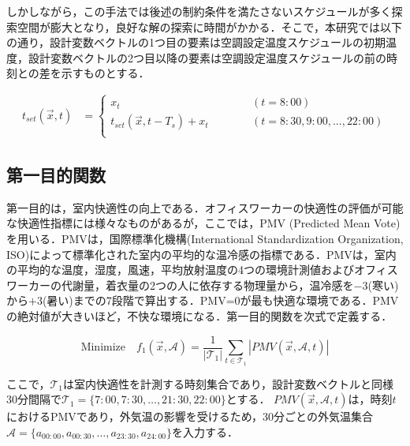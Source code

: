 しかしながら，この手法では後述の制約条件を満たさないスケジュールが多く探索空間が膨大となり，良好な解の探索に時間がかかる．そこで，本研究では以下の通り，設計変数ベクトルの1つ目の要素は空調設定温度スケジュールの初期温度，設計変数ベクトルの2つ目以降の要素は空調設定温度スケジュールの前の時刻との差を示すものとする．

\begin{align}
  t_{set}(\vec{x},t) & =
  \begin{cases}
    x_t ~~~~~~~~~~~~~~                          & (t=8:00)                 \\
    t_{set}(\vec{x},t-T_s) + x_t ~~~~~~~~~~~~~~ & (t=8:30, 9:00,...,22:00) \\
  \end{cases}
  \label{eq::math_variable_diff}
\end{align}

\subsection{第一目的関数}
第一目的は，室内快適性の向上である．オフィスワーカーの快適性の評価が可能な快適性指標には様々なものがあるが，ここでは，PMV (Predicted Mean Vote)を用いる．PMVは，国際標準化機構(International Standardization Organization, ISO)によって標準化された室内の平均的な温冷感の指標である\cite{ISO05}．PMVは，室内の平均的な温度，湿度，風速，平均放射温度の4つの環境計測値およびオフィスワーカーの代謝量，着衣量の2つの人に依存する物理量から，温冷感を$-3$(寒い)から$+3$(暑い)までの7段階で算出する．PMV=0が最も快適な環境である．PMVの絶対値が大きいほど，不快な環境になる．第一目的関数を次式で定義する．

\begin{equation}
  \mbox{Minimize} \quad f_1(\vec{x},\mathcal{A}) = \frac{1}{|\mathcal{T}_1|} \sum_{t\in \mathcal{T}_1} | PMV(\vec{x},\mathcal{A},t) |
  \label{eq::math_objective1}
\end{equation}

ここで，$\mathcal{T}_1$は室内快適性を計測する時刻集合であり，設計変数ベクトルと同様30分間隔で$\mathcal{T}_1=\{7:00, 7:30,\dots, 21:30, 22:00\}$とする．
$PMV(\vec{x},\mathcal{A},t)$は，時刻$t$におけるPMVであり，外気温の影響を受けるため，30分ごとの外気温集合$\mathcal{A}=\{a_{00:00},a_{00:30},\dotsc,a_{23:30},a_{24:00}\}$を入力する．

